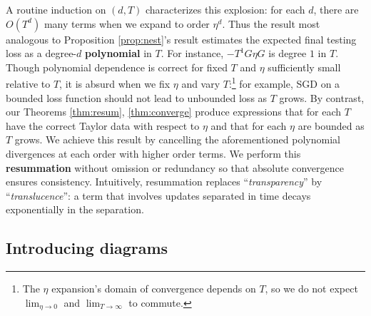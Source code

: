 \documentclass[anon,12pt]{colt2021} %
\begin{document}
            A routine induction on $(d,T)$ characterizes this explosion: for
            each $d$, there are $O(T^d)$ many terms when we expand to order
            $\eta^d$.  Thus the result most analogous to Proposition
            \ref{prop:nest}'s result estimates the expected final testing loss
            as a degree-$d$ \textbf{polynomial} in $T$.  For instance,
            \colorbox{moogold}{$-T^1G\eta G$} is degree $1$ in $T$.  Though
            polynomial dependence is correct for fixed $T$ and $\eta$
            sufficiently small relative to $T$, it is absurd when we fix $\eta$
            and vary
            $T$:\footnote{%
                The $\eta$ expansion's domain of convergence
                depends on $T$, so we do not expect $\lim_{\eta\to 0}$
                and $\lim_{T\to\infty}$ to commute.%
            }
            for example, SGD on a bounded loss function should not lead to 
            unbounded loss as $T$ grows.  By contrast, our
            Theorems \ref{thm:resum}, \ref{thm:converge} produce expressions
            that for each $T$ have the correct Taylor data with respect to
            $\eta$ and that for each $\eta$ are bounded as $T$ grows.  We
            achieve this result by cancelling the aforementioned polynomial
            divergences at each order with higher order terms.  We perform this
            \textbf{resummation} without omission or redundancy so
            that absolute convergence ensures consistency.  Intuitively, 
            resummation replaces ``\emph{transparency}'' by
            ``\emph{translucence}'': a term that involves updates
            separated in time decays exponentially in the separation.

        \subsection{Introducing diagrams}\label{sect:diagrams}
\end{document}
